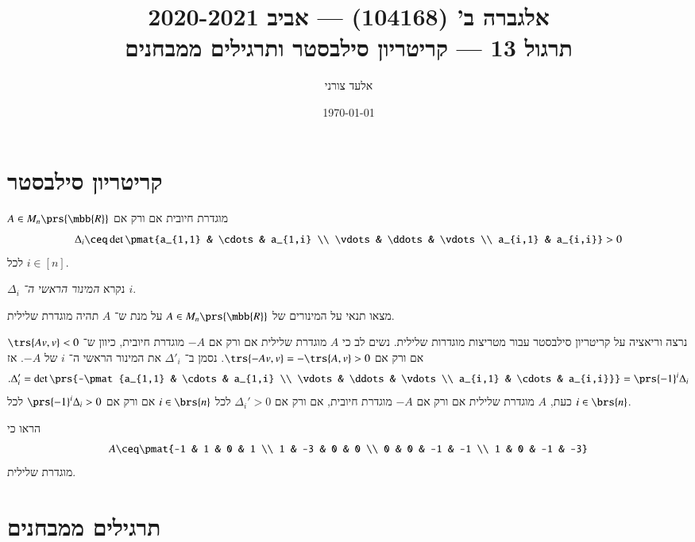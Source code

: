 \documentclass[a4paper,10pt,oneside,openany]{article}
\title{
אלגברה ב' (104168) \textenglish{---} אביב 2020-2021
\\
תרגול 13 \textenglish{---}
קריטריון סילבסטר
ותרגילים ממבחנים
}
\author{אלעד צורני}
\date{\today}
\begin{document}
\maketitle

\section{קריטריון סילבסטר}

\begin{theorem}
$A \in M_n\prs{\mbb{R}}$
מוגדרת חיובית אם ורק אם
\[\Delta_i \ceq \det \pmat{a_{1,1} & \cdots & a_{1,i} \\ \vdots & \ddots & \vdots \\ a_{i,1} & a_{i,i}} > 0\]
לכל
$i \in [n]$.
\end{theorem}

\begin{definition}
$\Delta_i$
נקרא
\emph{המינור הראשי ה־%
$i$}.
\end{definition}

\begin{exercise}
מצאו תנאי על המינורים של
$A \in M_n\prs{\mbb{R}}$
על מנת ש־%
$A$
תהיה מוגדרת שלילית.
\end{exercise}

\begin{solution}
נרצה וריאציה על קריטריון סילבסטר עבור מטריצות מוגדרות שלילית.
נשים לב כי
$A$
מוגדרת שלילית אם ורק אם
$-A$
מוגדרת חיובית, כיוון ש־%
$\trs{Av, v} < 0$
אם ורק אם
$\trs{-Av, v} = -\trs{A,v} > 0$.
נסמן ב־%
$\Delta'_i$
את המינור הראשי ה־%
$i$
של
$-A$.
אז
\[\text{.} \Delta_i' = \det\prs{-\pmat{a_{1,1} & \cdots & a_{1,i} \\ \vdots & \ddots & \vdots \\ a_{i,1} & \cdots & a_{i,i}}} = \prs{-1}^i \Delta_i\]
כעת,
$A$
מוגדרת שלילית אם ורק אם
$-A$
מוגדרת חיובית, אם ורק אם
$\Delta_i' > 0$
לכל
$i \in \brs{n}$
אם ורק אם
$\prs{-1}^i \Delta_i > 0$
לכל
$i \in \brs{n}$.
\end{solution}

\begin{exercise}
הראו כי
\[A \ceq \pmat{-1 & 1 & 0 & 1 \\ 1 & -3 & 0 & 0 \\ 0 & 0 & -1 & -1 \\ 1 & 0 & -1 & -3}\]
מוגדרת שלילית.
\end{exercise}

\section{תרגילים ממבחנים}
\end{document}

